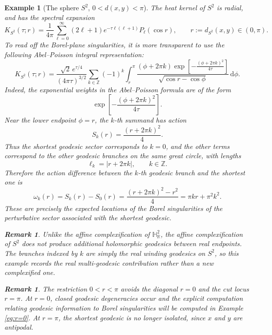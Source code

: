 \documentclass[11pt]{amsart}
\theoremstyle{plain}
\newtheorem{eg}[thm]{Example}
\newtheorem{rmk}[thm]{Remark}
\theoremstyle{definition}
\newcommand{\R}{\mathbb{R}}
\newcommand{\dd}{\mathrm d}
\newcommand{\HH}{\mathbb{H}}
\begin{document}
\begin{eg}[The sphere $S^2$, $0<d(x,y)<\pi$]
The heat kernel of $S^2$ is radial, and has the spectral expansion
\[
K_{S^2}(\tau;r)
=
\frac{1}{4\pi}
\sum_{\ell=0}^{\infty}
(2\ell+1)e^{-\tau\ell(\ell+1)}P_\ell(\cos r),\qquad r:=d_{S^2}(x,y)\in(0,\pi).
\]
To read off the Borel-plane singularities, it is more transparent to use the following Abel--Poisson integral representation:
\[
K_{S^2}(\tau;r)=\frac{\sqrt{2}\,e^{\tau/4}}{(4\pi\tau)^{3/2}}\sum_{k\in\mathbb Z}(-1)^k
\int_r^\pi \frac{(\phi+2\pi k)
\exp\!\left[-\frac{(\phi+2\pi k)^2}{4\tau}\right]}
{\sqrt{\cos r-\cos\phi}}
\,\dd\phi.
\]
Indeed, the exponential weights in the Abel--Poisson formula are of the form
\[
\exp\!\left[-\frac{(\phi+2\pi k)^2}{4\tau}\right].
\]
Near the lower endpoint $\phi=r$, the $k$-th summand has action
\[
S_k(r)=\frac{(r+2\pi k)^2}{4}.
\]
Thus the shortest geodesic sector corresponds to $k=0$, and the other terms correspond to the other geodesic branches on the same great circle, with lengths
\[
\ell_k=|r+2\pi k|,\qquad k\in\mathbb Z.
\]
Therefore the action difference between the $k$-th geodesic branch and the shortest one is
\[
\omega_k(r)=S_k(r)-S_0(r)=
\frac{(r+2\pi k)^2-r^2}{4}
=\pi k r+\pi^2 k^2.
\]
These are precisely the expected locations of the Borel singularities of the perturbative sector associated with the shortest geodesic.

\begin{rmk}
Unlike the affine complexification of $\HH_{\R}^2$, the affine complexification of $S^2$ does not produce additional holomorphic geodesics between real endpoints. The branches indexed by $k$ are simply the real winding geodesics on $S^2$, so this example records the real multi-geodesic contribution rather than a new complexified one.    
\end{rmk}


\begin{rmk}
The restriction $0<r<\pi$ avoids the diagonal $r=0$ and the cut locus $r=\pi$. At $r=0$, closed geodesic degeneracies occur and the explicit computation relating geodesic information to Borel singularities will be computed in Example \ref{eg:r=0}. At $r=\pi$, the shortest geodesic is no longer isolated, since $x$ and $y$ are antipodal. 
\end{rmk}
\end{eg}
\end{document}
